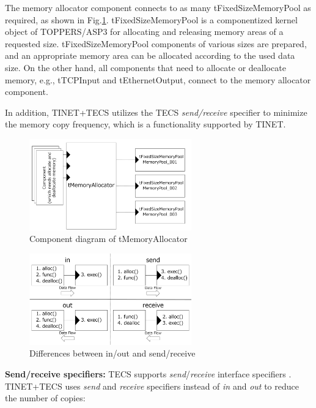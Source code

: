 \documentclass[JIP]{ipsj_v2/UTF8/ipsj}
\begin{document}
The memory allocator component connects to as many tFixedSizeMemoryPool as required, as shown in Fig.\ref{fig:tMemoryAllocator}.
tFixedSizeMemoryPool is a componentized kernel object of TOPPERS/ASP3 for allocating and releasing memory areas of a requested size. 
tFixedSizeMemoryPool components of various sizes are prepared, and an appropriate memory area can be allocated according to the used data size.
On the other hand, all components that need to allocate or deallocate memory, e.g., tTCPInput and tEthernetOutput, connect to the memory allocator component.

In addition, TINET+TECS utilizes the TECS {\it send/receive} specifier to minimize the memory copy frequency, which is a functionality supported by TINET.

\begin{figure}[t]
    \centering
    \includegraphics[width=7.0cm,clip]{figure/tMemoryAllocator.pdf}
    \caption{Component diagram of tMemoryAllocator}
    \label{fig:tMemoryAllocator}
\end{figure}

\begin{figure}[t]
    \centering
    \includegraphics[width=7.0cm,clip]{figure/SendReceive.pdf}
    \caption{Differences between in/out and send/receive}
    \label{fig:SendReceive}
\end{figure}

{\bf Send/receive specifiers:}
TECS supports {\it send}/{\it receive} interface specifiers \cite{par:RPC}.
TINET+TECS uses {\it send} and {\it receive} specifiers instead of {\it in} and {\it out} to reduce the number of copies:
\end{document}
